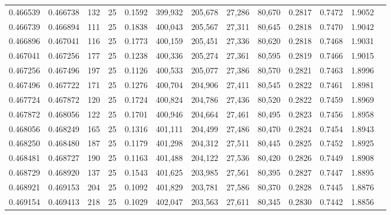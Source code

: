 \begin{tabular}{rrrrrrrrrrrrr}
0.466539 & 0.466738 &   132 &  25 &                                     0.1592 & 399,932 & 205,678 &  27,286 &  80,670 & 0.2817 & 0.7472 & 1.9052 \\
0.466739 & 0.466894 &   111 &  25 &                                     0.1838 & 400,043 & 205,567 &  27,311 &  80,645 & 0.2818 & 0.7470 & 1.9042 \\
0.466896 & 0.467041 &   116 &  25 &                                     0.1773 & 400,159 & 205,451 &  27,336 &  80,620 & 0.2818 & 0.7468 & 1.9031 \\
0.467041 & 0.467256 &   177 &  25 &                                     0.1238 & 400,336 & 205,274 &  27,361 &  80,595 & 0.2819 & 0.7466 & 1.9015 \\
0.467256 & 0.467496 &   197 &  25 &                                     0.1126 & 400,533 & 205,077 &  27,386 &  80,570 & 0.2821 & 0.7463 & 1.8996 \\
0.467496 & 0.467722 &   171 &  25 &                                     0.1276 & 400,704 & 204,906 &  27,411 &  80,545 & 0.2822 & 0.7461 & 1.8981 \\
0.467724 & 0.467872 &   120 &  25 &                                     0.1724 & 400,824 & 204,786 &  27,436 &  80,520 & 0.2822 & 0.7459 & 1.8969 \\
0.467872 & 0.468056 &   122 &  25 &                                     0.1701 & 400,946 & 204,664 &  27,461 &  80,495 & 0.2823 & 0.7456 & 1.8958 \\
0.468056 & 0.468249 &   165 &  25 &                                     0.1316 & 401,111 & 204,499 &  27,486 &  80,470 & 0.2824 & 0.7454 & 1.8943 \\
0.468250 & 0.468480 &   187 &  25 &                                     0.1179 & 401,298 & 204,312 &  27,511 &  80,445 & 0.2825 & 0.7452 & 1.8925 \\
0.468481 & 0.468727 &   190 &  25 &                                     0.1163 & 401,488 & 204,122 &  27,536 &  80,420 & 0.2826 & 0.7449 & 1.8908 \\
0.468729 & 0.468920 &   137 &  25 &                                     0.1543 & 401,625 & 203,985 &  27,561 &  80,395 & 0.2827 & 0.7447 & 1.8895 \\
0.468921 & 0.469153 &   204 &  25 &                                     0.1092 & 401,829 & 203,781 &  27,586 &  80,370 & 0.2828 & 0.7445 & 1.8876 \\
0.469154 & 0.469413 &   218 &  25 &                                     0.1029 & 402,047 & 203,563 &  27,611 &  80,345 & 0.2830 & 0.7442 & 1.8856 \\

\end{tabular}
